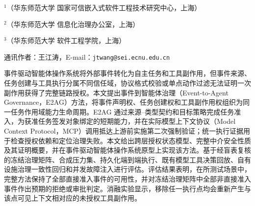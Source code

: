 \thispagestyle{josfirst}

\vspace{2pt}

\vspace{7pt}

\vspace{4pt}
\begingroup\fontsize{8pt}{12pt}\selectfont
\noindent$^{1}$（华东师范大学 国家可信嵌入式软件工程技术研究中心，上海）\par
\noindent$^{2}$（华东师范大学 信息化治理办公室，上海）\par
\noindent$^{3}$（华东师范大学 软件工程学院，上海）\par
\noindent 通讯作者：王江涛，E-mail：\texttt{jtwang@sei.ecnu.edu.cn}\par
\endgroup

\begin{joszhabstract}
事件驱动智能体操作系统将外部事件转化为自主任务和工具副作用，但事件来源、任务创建与工具执行分属不同信任域，协议格式校验或单点动作过滤无法证明一次副作用获得了完整链路授权。本文提出事件到智能体治理（Event-to-Agent Governance，E2AG）方法，将事件声明权、任务创建权和工具副作用权组织为同一任务作用域能力生命周期。E2AG 通过来源--类型契约和目标策略完成任务准入，为获准任务签发对象绑定的短期能力，并在实际模型上下文协议（Model Context Protocol，MCP）调用抵达上游前实施第二次强制验证；统一执行证据用于检查授权依赖和定位治理失败。本文给出跨层授权状态模型、完整中介安全性质及其证明概要，并在事件驱动智能体操作系统原型上实现该方法。基于经盲表复核的冻结治理矩阵、合成压力集、持久化端到端执行、既有模型工具决策回放、自有设施治理一致性回归和并发故障注入进行评估。评估结果表明，在所测试场景中，完整方法保持了全部直接准入事件的可用性，并对冻结治理矩阵中全部非直接准入事件作出预期的拒绝或审批判定。消融实验显示，移除任一执行点均会重新产生与该点可见上下文相对应的未授权工具副作用。
\end{joszhabstract}

